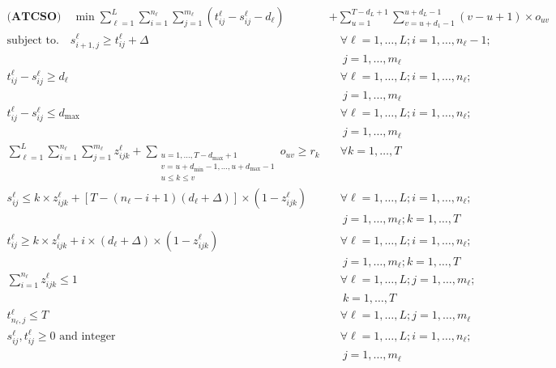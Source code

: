 \documentclass[11pt]{article}
\begin{document}
\begin{align}
\label{eq.ATCSobj}\textbf{(ATCSO)}\quad\min \sum_{\ell=1}^L\sum_{i=1}^{n_\ell}\sum_{j=1}^{m_\ell}(t_{ij}^\ell-s_{ij}^\ell-d_\ell) &+ \sum_{u=1}^{T-d_L+1}\sum_{v=u+d_1-1}^{u+d_L-1}(v-u+1)\times o_{uv}\\
\label{eq.ATCSnextshiftcon}\text{subject to.} \quad s_{i+1,j}^\ell  \ge t_{ij}^\ell + \Delta &\quad \forall \ell = 1,\ldots,L; i=1,\ldots,n_\ell-1;\\
\nonumber &\quad\  j=1,\ldots, m_\ell\\
\label{eq.ATCSminshiftlength}t_{ij}^\ell - s_{ij}^\ell \ge d_\ell   &\quad \forall \ell = 1,\ldots,L; i=1,\ldots,n_\ell; \\
\nonumber &\quad\ j=1,\ldots, m_\ell\\
\label{eq.ATCSmaxshiftlength}t_{ij}^\ell - s_{ij}^\ell \le d_{\max}   &\quad \forall \ell = 1,\ldots,L; i=1,\ldots,n_\ell; \\
\nonumber & \quad\ j=1,\ldots, m_\ell\\
\label{eq.ATCSdemandcon} \sum_{\ell=1}^L\sum_{i=1}^{n_\ell}\sum_{j=1}^{m_\ell}z_{ijk}^\ell + \sum_{\substack{u=1,\ldots, T-d_{\max}+1\\ v =  u+d_{\min}-1, \ldots, u+d_{\max}-1\\ u \le k \le v}}o_{uv}\ge r_k  &\quad \forall k=1,\ldots,T\\
\label{eq.ATCSstartb4k}s_{ij}^\ell \le k\times z_{ijk}^\ell + [T-(n_\ell-i+1)(d_\ell + \Delta)]\times(1-z_{ijk}^\ell) &\quad \forall \ell = 1,\ldots,L; i=1,\ldots,n_\ell; \\
\nonumber &\quad \ j=1,\ldots, m_\ell; k=1,\ldots,T\\
\label{eq.ATCSendafterk}t_{ij}^\ell \ge k\times z_{ijk}^\ell + i\times(d_\ell+\Delta)\times(1-z_{ijk}^\ell) &\quad \forall \ell = 1,\ldots,L; i=1,\ldots,n_\ell; \\
\nonumber &\quad \ j=1,\ldots, m_\ell; k=1,\ldots,T\\
\label{eq.ATCSdisaggZ}\sum_{i=1}^{n_\ell}z_{ijk}^\ell \le 1 &\quad  \forall \ell = 1,\ldots,L; j=1,\ldots, m_\ell; \\[-3mm]
\nonumber &\quad\ k=1,\ldots,T\\
\label{eq.lastshiftbound} t_{n_\ell,j}^\ell \le T &\quad \forall \ell = 1,\ldots,L; j=1,\ldots, m_\ell\\
\label{eq.ATCSNN} s_{ij}^\ell, t_{ij}^\ell  \ge 0 \text{ and integer}  &\quad \forall \ell = 1,\ldots,L; i=1,\ldots,n_\ell; \\
\nonumber & \quad\ j=1,\ldots, m_\ell
\end{align}
\end{document}
